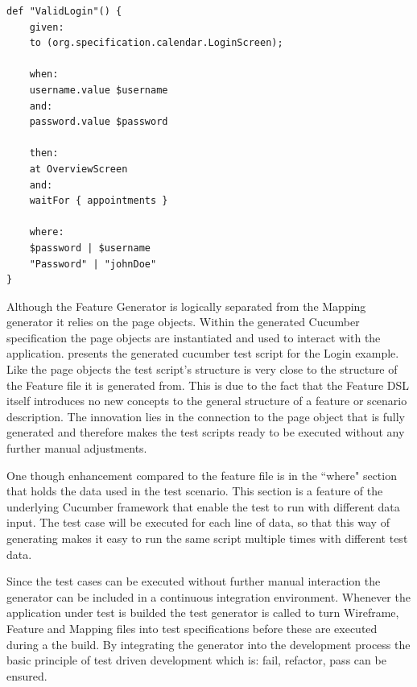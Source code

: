 \documentclass{sig-alternate-05-2015}
\begin{document}
\begin{lstlisting}[captionpos=b, caption=Generated Feature File, label={lst:featureGenerated}, language=dsl]
	def "ValidLogin"() {
	given:
	to (org.specification.calendar.LoginScreen);
	
	when:
	username.value $username
	and:
	password.value $password
	
	then:
	at OverviewScreen
	and:
	waitFor { appointments }
	
	where:
	$password | $username
	"Password" | "johnDoe"
}
\end{lstlisting}

Although the Feature Generator is logically separated from the Mapping generator it relies on the page objects.
Within the generated Cucumber specification the page objects are instantiated and used to interact with the application.
 presents the generated cucumber test script for the Login example. 
Like the page objects the test script's structure is very close to the structure of the Feature file it is generated from.
This is due to the fact that the Feature DSL itself introduces no new concepts to the general structure of a feature or scenario description.
The innovation lies in the connection to the page object that is fully generated and therefore makes the test scripts ready to be executed without any further manual adjustments.

One though enhancement compared to the feature file is in the ``where" section that holds the data used in the test scenario.
This section is a feature of the underlying Cucumber framework that enable the test to run with different data input. 
The test case will be executed for each line of data, so that this way of generating makes it easy to run the same script multiple times with different test data.

Since the test cases can be executed without further manual interaction the generator can be included in a continuous integration environment.
Whenever the application under test is builded the test generator is called to turn Wireframe, Feature and Mapping files into test specifications before these are executed during a the build.
By integrating the generator into the development process the basic principle of test driven development which is: fail, refactor, pass can be ensured.

\end{document}
